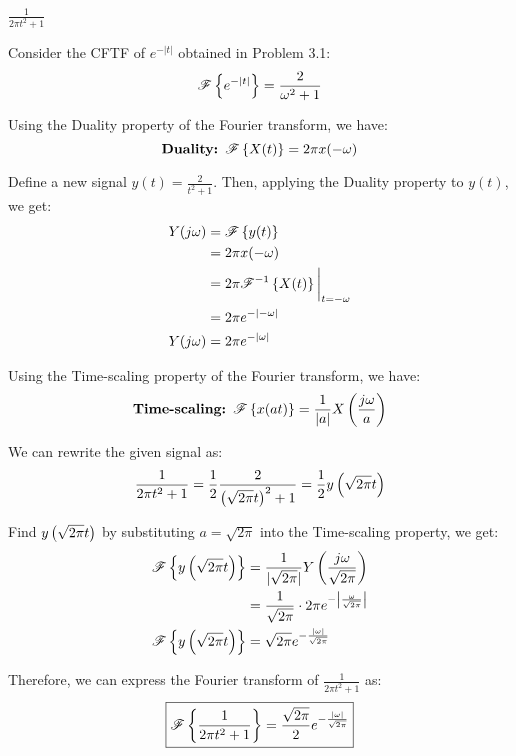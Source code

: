 \documentclass[a4paper, 10pt]{article}
\begin{document}
\begin{subsubproblems}[start=3]
    \item \( \frac{1}{2\pi t^2 + 1} \)
\end{subsubproblems}

\begin{solution}
Consider the CFTF of \( e^{-|t|} \) obtained in Problem 3.1:
\[
    \mathscr{F} \left\{ e^{-|t|} \right\} = \frac{2}{\omega^2 + 1}
\]

Using the Duality property of the Fourier transform, we have:
\[
    \textbf{Duality: } \mathscr{F} \left\{ X(t) \right\} = 2\pi x(-\omega)
\]

Define a new signal \( y(t) = \frac{2}{t^2 + 1} \). Then, applying the Duality property to \( y(t) \), we get:
\begin{align*}  
    Y(j\omega) &= \mathscr{F} \left\{ y(t) \right\} \\
    &= 2\pi x(-\omega) \\
    &= 2\pi \mathscr{F}^{-1} \left\{ X(t) \right\} \bigg|_{t = -\omega} \\
    &= 2\pi e^{-|- \omega|} \\
    Y(j\omega) &= 2\pi e^{-|\omega|}
\end{align*}

Using the Time-scaling property of the Fourier transform, we have:
\[
    \textbf{Time-scaling: } \mathscr{F} \left\{ x(at) \right\} = \frac{1}{|a|} X\left( \frac{j\omega}{a} \right)
\]

We can rewrite the given signal as:
\[ \frac{1}{2\pi t^2 + 1} = \frac{1}{2} \frac{2}{ \left( \sqrt{2\pi} t \right)^2 + 1} = \frac{1}{2} y\left( \sqrt{2\pi} t \right) \]

Find \( y\left( \sqrt{2\pi} t \right) \) by substituting \( a = \sqrt{2\pi} \) into the Time-scaling property, we get:
\begin{align*}
    \mathscr{F} \left\{ y\left( \sqrt{2\pi} t \right) \right\} &= \frac{1}{|\sqrt{2\pi}|} Y\left( \frac{j\omega}{\sqrt{2\pi}} \right) \\
    &= \frac{1}{\sqrt{2\pi}} \cdot 2\pi e^{- \left| \frac{\omega}{\sqrt{2\pi}} \right|} \\
    \mathscr{F} \left\{ y\left( \sqrt{2\pi} t \right) \right\} &= \sqrt{2\pi} e^{- \frac{|\omega|}{\sqrt{2\pi}} }
\end{align*}

Therefore, we can express the Fourier transform of \( \frac{1}{2\pi t^2 + 1} \) as:
\[ \boxed{
    \mathscr{F} \left\{ \frac{1}{2\pi t^2 + 1} \right\} = \frac{\sqrt{2\pi}}{2} e^{- \frac{|\omega|}{\sqrt{2\pi}} }
} \]
\end{solution}
\end{document}
